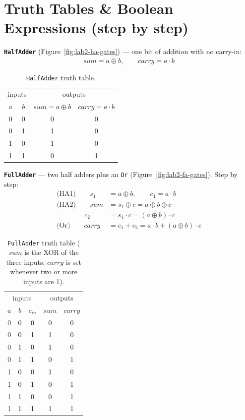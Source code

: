 \documentclass[11pt]{article}
\begin{document}
\section{Truth Tables \& Boolean Expressions (step by step)}

\textbf{\texttt{HalfAdder}} (Figure~\ref{fig:lab2-ha-gates}) --- one bit of addition with no carry-in:
\begin{align}
  sum = a\oplus b, \qquad carry = a\cdot b \nonumber
\end{align}

\begin{table}[h]
\centering
\small
\begin{tabular}{@{}c c | c c@{}}
\toprule
\multicolumn{2}{c}{inputs} & \multicolumn{2}{c}{outputs} \\
$a$ & $b$ & $sum=a\oplus b$ & $carry=a\cdot b$ \\
\midrule
0 & 0 & 0 & 0 \\
0 & 1 & 1 & 0 \\
1 & 0 & 1 & 0 \\
1 & 1 & 0 & 1 \\
\bottomrule
\end{tabular}
\caption{\texttt{HalfAdder} truth table.}
\label{tab:lab2-ha-tt}
\end{table}

\noindent\textbf{\texttt{FullAdder}} --- two half adders plus an \texttt{Or} (Figure~\ref{fig:lab2-fa-gates}). Step by step:
\begin{align}
  \text{(HA1)}\qquad s_1 &= a\oplus b, \qquad c_1 = a\cdot b \nonumber\\
  \text{(HA2)}\qquad sum &= s_1\oplus c = a\oplus b\oplus c \nonumber\\
  \qquad\qquad c_2 &= s_1\cdot c = (a\oplus b)\cdot c \nonumber\\
  \text{(Or)}\qquad carry &= c_1 + c_2 = a\cdot b + (a\oplus b)\cdot c \nonumber
\end{align}

\begin{table}[h]
\centering
\small
\begin{tabular}{@{}c c c | c c@{}}
\toprule
\multicolumn{3}{c}{inputs} & \multicolumn{2}{c}{outputs} \\
$a$ & $b$ & $c_{in}$ & $sum$ & $carry$ \\
\midrule
0 & 0 & 0 & 0 & 0 \\
0 & 0 & 1 & 1 & 0 \\
0 & 1 & 0 & 1 & 0 \\
0 & 1 & 1 & 0 & 1 \\
1 & 0 & 0 & 1 & 0 \\
1 & 0 & 1 & 0 & 1 \\
1 & 1 & 0 & 0 & 1 \\
1 & 1 & 1 & 1 & 1 \\
\bottomrule
\end{tabular}
\caption{\texttt{FullAdder} truth table ($sum$ is the XOR of the three inputs; $carry$ is set whenever two or more inputs are 1).}
\label{tab:lab2-fa-tt}
\end{table}
\end{document}

